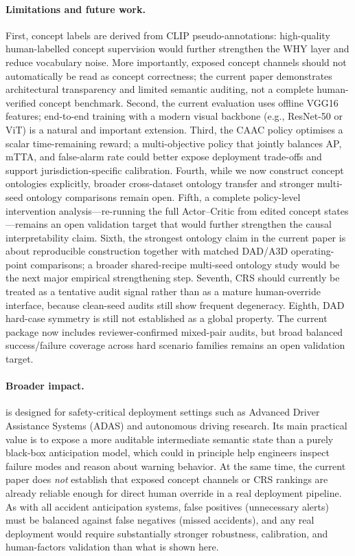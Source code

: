 \paragraph{Limitations and future work.}
First, concept labels are derived from CLIP pseudo-annotations:
high-quality human-labelled concept supervision would further strengthen
the WHY layer and reduce vocabulary noise. More importantly, exposed concept
channels should not automatically be read as concept correctness; the current
paper demonstrates architectural transparency and limited semantic auditing,
not a complete human-verified concept benchmark.
Second, the current evaluation uses offline VGG16 features;
end-to-end training with a modern visual backbone (e.g., ResNet-50 or ViT)
is a natural and important extension.
Third, the CAAC policy optimises a scalar time-remaining reward;
a multi-objective policy that jointly balances AP, mTTA, and
false-alarm rate could better expose deployment trade-offs and
support jurisdiction-specific calibration.
Fourth, while we now construct concept ontologies explicitly, broader
cross-dataset ontology transfer and stronger multi-seed ontology comparisons
remain open.
Fifth, a complete policy-level intervention analysis---re-running
the full Actor--Critic from edited concept states---remains an
open validation target that would further strengthen the causal
interpretability claim.
Sixth, the strongest ontology claim in the current paper is about reproducible
construction together with matched DAD/A3D operating-point comparisons; a
broader shared-recipe multi-seed ontology study would be the next major
empirical strengthening step.
Seventh, CRS should currently be treated as a tentative audit signal rather
than as a mature human-override interface, because clean-seed audits still show
frequent degeneracy.
Eighth, DAD hard-case symmetry is still not established as a global property.
The current package now includes reviewer-confirmed mixed-pair audits, but
broad balanced success/failure coverage across hard scenario families remains
an open validation target.

\paragraph{Broader impact.}
\method{} is designed for safety-critical deployment settings such as
Advanced Driver Assistance Systems (ADAS) and autonomous driving research.
Its main practical value is to expose a more auditable intermediate semantic
state than a purely black-box anticipation model, which could in principle help
engineers inspect failure modes and reason about warning behavior. At the same
time, the current paper does \emph{not} establish that exposed concept channels
or CRS rankings are already reliable enough for direct human override in a real
deployment pipeline. As with all accident anticipation systems, false positives
(unnecessary alerts) must be balanced against false negatives (missed
accidents), and any real deployment would require substantially stronger
robustness, calibration, and human-factors validation than what is shown here.
